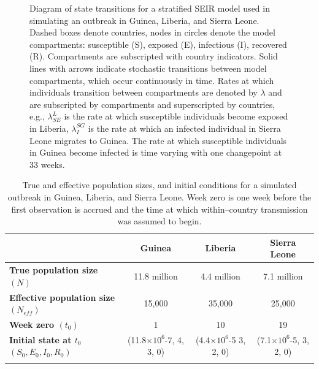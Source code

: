 \begin{figure}[htbp]
{
	}
	\caption[Model diagram for a stratified SEIR model with country specific outbreak dynamics and cross--country transmission.]{Diagram of state transitions for a stratified SEIR model used in simulating an outbreak in Guinea, Liberia, and Sierra Leone. Dashed boxes denote countries, nodes in circles denote the model compartments: susceptible (S), exposed (E), infectious (I), recovered (R). Compartments  are subscripted with country indicators. Solid lines with arrows indicate stochastic transitions between model compartments, which occur continuously in time. Rates at which individuals transition between compartments are denoted by $ \lambda $ and are subscripted by compartments and superscripted by countries, e.g., $ \lambda_{SE}^L $ is the rate at which susceptible individuals become exposed in Liberia, $ \lambda_I^{SG} $ is the rate at which an infected individual in Sierra Leone migrates to Guinea. The rate at which susceptible individuals in Guinea become infected is time varying with one changepoint at 33 weeks.}
	\label{fig:stratified_seir_full_diag}
\end{figure}

\begin{table}[htbp]
	\caption[Week zero, and true and effective population sizes for a simulated Ebola outbreak in West Africa.]{True and effective population sizes, and initial conditions for a simulated outbreak in Guinea, Liberia, and Sierra Leone. Week zero is one week before the first observation is accrued and the time at which within--country transmission was assumed to begin. }
	\label{tab:ebola_synth_consts}
	\footnotesize
	\centering
	\begin{tabular}{lccc}	
		\hline	
		& \textbf{Guinea} & \textbf{Liberia} & \textbf{Sierra Leone} \\\hline
		\textbf{True population size $ (N)$} & 11.8 million & 4.4 million & 7.1 million \\ 
		\textbf{Effective population size $ (N_{eff}) $} & 15,000 & 35,000 & 25,000 \\
		\textbf{Week zero $ (t_0) $} & 1 & 10 & 19 \\
		\textbf{Initial state at $ t_0 $} $ (S_0,E_0,I_0,R_0) $ & (11.8$ \times 10^6$-7, 4, 3, 0) & (4.4$ \times 10^6$-5 3, 2, 0)& (7.1$ \times 10^6$-5, 3, 2, 0) \\
		\hline
		&&&
	\end{tabular} 
\end{table}

